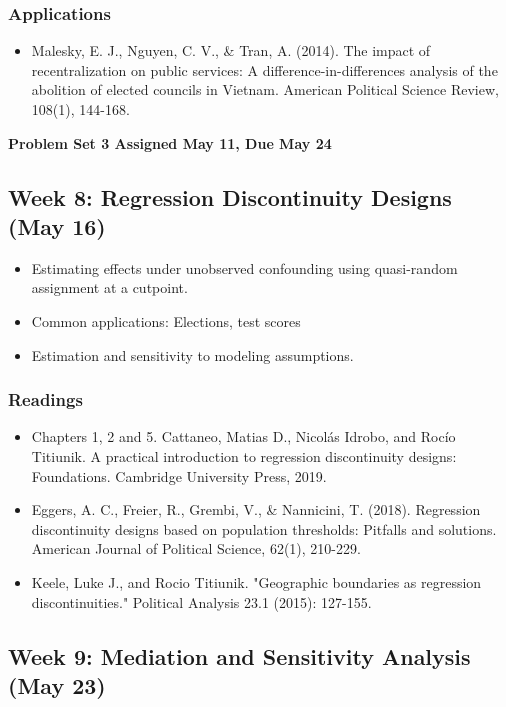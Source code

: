 \documentclass[11pt, article, oneside]{memoir}
\theoremstyle{Assumption}
\begin{document}
\subsubsection*{Applications}

\begin{itemize}
\item Malesky, E. J., Nguyen, C. V., \& Tran, A. (2014). The impact of recentralization on public services: A difference-in-differences analysis of the abolition of elected councils in Vietnam. American Political Science Review, 108(1), 144-168.
\end{itemize}

\textbf{Problem Set 3 Assigned May 11, Due May 24}

\subsection{Week 8: Regression Discontinuity Designs (May 16)}

\begin{itemize}
\item Estimating effects under unobserved confounding using quasi-random assignment at a cutpoint.
\item Common applications: Elections, test scores
\item Estimation and sensitivity to modeling assumptions.
\end{itemize}

\subsubsection*{Readings}

\begin{itemize}
\item Chapters 1, 2 and 5. Cattaneo, Matias D., Nicolás Idrobo, and Rocío Titiunik. A practical introduction to regression discontinuity designs: Foundations. Cambridge University Press, 2019.
\item Eggers, A. C., Freier, R., Grembi, V., \& Nannicini, T. (2018). Regression discontinuity designs based on population thresholds: Pitfalls and solutions. American Journal of Political Science, 62(1), 210-229.
\item Keele, Luke J., and Rocio Titiunik. "Geographic boundaries as regression discontinuities." Political Analysis 23.1 (2015): 127-155.
\end{itemize}



\subsection{Week 9: Mediation and Sensitivity Analysis (May 23)}
\end{document}
